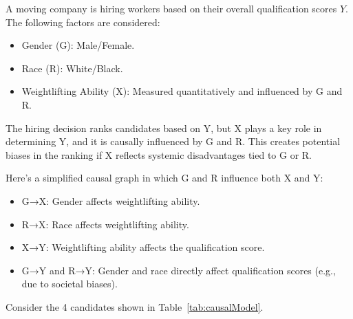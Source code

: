 \begin{example}
A moving company is hiring workers based on their overall qualification scores $Y$. The following factors are considered:
\begin{itemize}
    \item Gender (G): Male/Female. 
    \item Race (R): White/Black.
    \item Weightlifting Ability (X): Measured quantitatively and influenced by G and R.
\end{itemize}
The hiring decision ranks candidates based on Y, but X plays a key role in determining Y, and it is causally influenced by G and R. This creates potential biases in the ranking if X reflects systemic disadvantages tied to G or R.

Here’s a simplified causal graph in which G and R influence both X and Y:

\begin{itemize}
    \item G→X: Gender affects weightlifting ability.
    \item R→X: Race affects weightlifting ability.
    \item X→Y: Weightlifting ability affects the qualification score.
    \item G→Y and R→Y: Gender and race directly affect qualification scores (e.g., due to societal biases).
\end{itemize}

Consider the 4 candidates shown in Table~\ref{tab:causalModel}.


\end{example}
